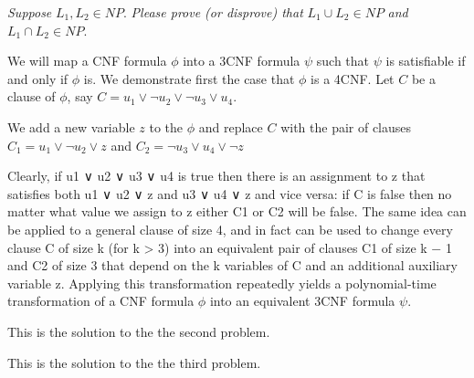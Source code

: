 \documentclass{cis320}
\begin{document}
\maketitle



\HWproblem
\textit{Suppose} \( L_1, L_2 \in NP \). \textit{Please prove (or disprove) that }\( L_1 \cup L_2 \in NP \) \textit{and} \(L_1 \cap L_2 \in NP\).

We will map a CNF formula $\phi$ into a 3CNF formula $\psi$ such that $\psi$ is satisfiable if and only if
$\phi$ is. We demonstrate first the case that $\phi$ is a 4CNF. Let $C$ be a clause of $\phi$, say $C = u_1 \lor \neg u_2 \lor \neg u_3 \lor u_4$.

We add a new variable $z$ to the $\phi$ and replace $C$ with the pair of clauses $C_1 = u_1 \lor \neg u_2 \lor z$ and $C_2 = \neg u_3 \lor u_4 \lor \neg z$ 


Clearly, if u1 ∨ u2 ∨ u3 ∨ u4 is true then there is an assignment to z that satisfies both u1 ∨ u2 ∨ z and u3 ∨ u4 ∨ z and vice versa: if C is false then no matter what value we assign to z either C1 or C2 will be false. The same idea can be applied to a general clause of size 4, and in fact can be used to change every clause C of size k (for k > 3) into an equivalent pair of clauses C1 of size k − 1 and C2 of size 3 that depend on the k variables of C and an additional auxiliary variable z. Applying this transformation repeatedly yields a polynomial-time transformation of a CNF formula $\phi$ into an equivalent 3CNF formula $\psi$.




\HWproblem
This is the solution to the the second problem.

\HWproblem
This is the solution to the the third problem.
\end{document}
